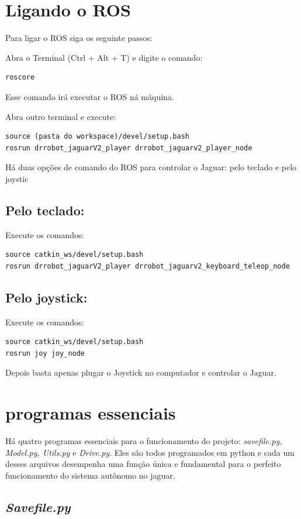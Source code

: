\section{Ligando o ROS}
Para ligar o ROS siga os seguinte passos:

Abra o Terminal (Ctrl + Alt + T) e digite o comando:
\begin{lstlisting}
roscore
\end{lstlisting}
Esse comando irá executar o ROS ná máquina.

Abra outro terminal e execute:
\begin{lstlisting}
source (pasta do workspace)/devel/setup.bash
rosrun drrobot_jaguarV2_player drrobot_jaguarv2_player_node 
\end{lstlisting}
Há duas opções de comando do ROS para controlar o Jaguar: pelo teclado e pelo joystic

\subsection{Pelo teclado:}
Execute os comandos:
\begin{lstlisting}
source catkin_ws/devel/setup.bash
rosrun drrobot_jaguarV2_player drrobot_jaguarv2_keyboard_teleop_node
\end{lstlisting}

\subsection{Pelo joystick:}

Execute os comandos:
\begin{lstlisting}
source catkin_ws/devel/setup.bash
rosrun joy joy_node
\end{lstlisting}
Depois basta apenas plugar o Joystick no computador e controlar o Jaguar.

\section{programas essenciais}
\label{sec:programas essenciais}
Há quatro programas essenciais para o funcionamento do projeto: \textit{savefile.py, Model.py, Utils.py} e \textit{Drive.py}. Eles são todos programados em python e cada um desses arquivos desempenha uma função única e fundamental para o perfeito funcionamento do sistema autônomo no jaguar.

\subsection{\textit{Savefile.py}}
\label{sec:Savefile.py}

